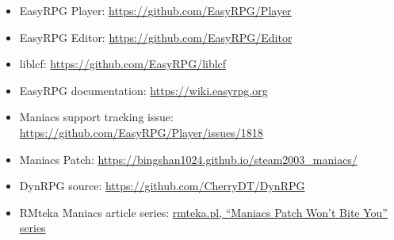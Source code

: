 \documentclass[11pt,a4paper]{article}
\begin{document}
\begin{itemize}
  \item EasyRPG Player: \url{https://github.com/EasyRPG/Player}
  \item EasyRPG Editor: \url{https://github.com/EasyRPG/Editor}
  \item liblcf: \url{https://github.com/EasyRPG/liblcf}
  \item EasyRPG documentation: \url{https://wiki.easyrpg.org}
  \item Maniacs support tracking issue: \url{https://github.com/EasyRPG/Player/issues/1818}
  \item Maniacs Patch: \url{https://bingshan1024.github.io/steam2003_maniacs/}
  \item DynRPG source: \url{https://github.com/CherryDT/DynRPG}
  \item RMteka Maniacs article series: \href{https://www.rmteka.pl/maniacs-patch-wont-bite-you-1-basic-feature-changes/}{rmteka.pl, ``Maniacs Patch Won't Bite You'' series}
\end{itemize}
\end{document}
